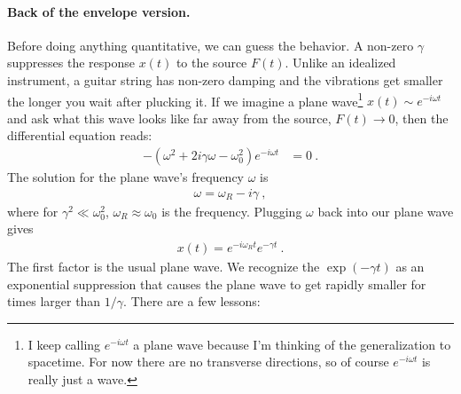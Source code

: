  \paragraph{Back of the envelope version.}
 Before doing anything quantitative, we can guess the behavior. A non-zero $\gamma$ suppresses the response $x(t)$ to the source $F(t)$. Unlike an idealized instrument, a guitar string has non-zero damping and the vibrations get smaller the longer you wait after plucking it. If we imagine a plane wave\footnote{I keep calling $e^{-i\omega t}$ a plane wave because I'm thinking of the generalization to spacetime. For now there are no transverse directions, so of course $e^{-i\omega t}$ is really just a wave.} $x(t)\sim e^{-i\omega t}$ and ask what this wave looks like far away from the source, $F(t)\to 0$, then the differential equation reads:
 \begin{align}
  -\left(\omega^2 +2i\gamma \omega - \omega_0^2\right)e^{-i\omega t} &= 0 \ .
 \end{align}
 The solution for the plane wave's frequency $\omega$ is
 \begin{align}
  \omega = \omega_R - i\gamma \ , \label{eq:DHO:back:envelope:poles}
 \end{align}
 where for $\gamma^2 \ll \omega_0^2$, $\omega_R \approx \omega_0$ is the frequency.  Plugging $\omega$ back into our plane wave gives
 \begin{align}
  x(t) = e^{-i\omega_R t}e^{-\gamma t} \ .
 \end{align}
 The first factor is the usual plane wave. We recognize the $\exp(-\gamma t)$ as an exponential suppression that causes the plane wave to get rapidly smaller for times larger than $1/\gamma$. There are a few lessons:

